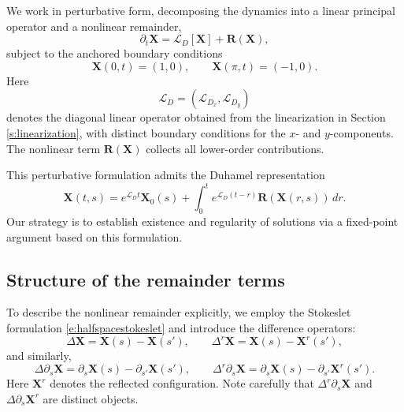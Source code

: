\documentclass{amsart}
\begin{document}
We work in perturbative form, decomposing the dynamics into a linear principal operator and a nonlinear remainder,
\begin{equation}\label{eq:perturbative_form}
\partial_t \mathbf{X}
=
\mathcal{L}_D [\mathbf{X}] + \mathbf{R}(\mathbf{X}),
\end{equation}
subject to the anchored boundary conditions
\[
\mathbf{X}(0,t) = (1,0),
\qquad
\mathbf{X}(\pi,t) = (-1,0).
\]
Here
\[
\mathcal{L}_D = (\mathcal{L}_{D_x},\mathcal{L}_{D_y})
\]
denotes the diagonal linear operator obtained from the linearization in Section \ref{s:linearization}, with distinct boundary conditions for the $x$- and $y$-components. The nonlinear term $\mathbf{R}(\mathbf{X})$ collects all lower-order contributions.

This perturbative formulation admits the Duhamel representation
\begin{equation}\label{eq:Duhamel}
\mathbf{X}(t,s)
=
e^{\mathcal{L}_D t}\mathbf{X}_0(s)
+
\int_{0}^{t}
e^{\mathcal{L}_D (t-r)} \mathbf{R}(\mathbf{X}(r,s))\, dr .
\end{equation}
Our strategy is to establish existence and regularity of solutions via a fixed-point argument based on this formulation.

\subsection{Structure of the remainder terms}

To describe the nonlinear remainder explicitly, we employ the Stokeslet formulation \eqref{e:halfspacestokeslet} and introduce the difference operators:
\[
\Delta \mathbf{X} = \mathbf{X}(s) - \mathbf{X}(s'),
\qquad
\Delta^r \mathbf{X} = \mathbf{X}(s) - \mathbf{X}^r(s'),
\]
and similarly,
\[
\Delta \partial_s \mathbf{X} = \partial_s \mathbf{X}(s) - \partial_{s'} \mathbf{X}(s'),
\qquad
\Delta^r \partial_s \mathbf{X} = \partial_s \mathbf{X}(s) - \partial_{s'} \mathbf{X}^r(s').
\]
Here $\mathbf{X}^r$ denotes the reflected configuration. Note carefully that $\Delta^r \partial_s \mathbf{X}$ and $\Delta \partial_s \mathbf{X}^r$ are distinct objects. 
\end{document}
